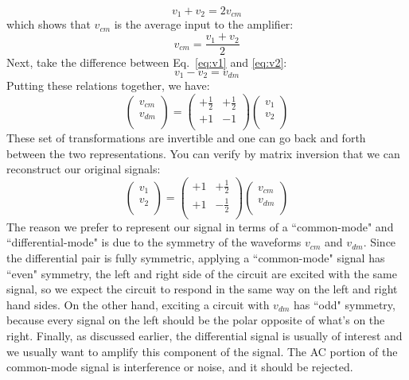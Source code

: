     \begin{equation}
        v_1 + v_2 = 2 v_{cm}
    \end{equation}
which shows that $v_{cm}$ is the average input to the amplifier:
    \begin{equation}
        v_{cm} = \frac{v_1 + v_2}{2}
    \end{equation}
Next, take the difference between Eq.~\ref{eq:v1} and \ref{eq:v2}:
    \begin{equation}
        v_1 - v_2 = v_{dm} 
    \end{equation}
Putting these relations together, we have:
    \begin{equation}
    	\begin{pmatrix}
    		v_{cm}\\
    		v_{dm}\\
    	\end{pmatrix} =
    	\begin{pmatrix}
    		+\frac{1}{2} & +\frac{1}{2}\\
    		+1 & -1\\
    	\end{pmatrix} 
    	\begin{pmatrix}
    		v_{1}\\
    		v_{2}\\
    	\end{pmatrix} 
    \end{equation}  
These set of transformations are invertible and one can go back and forth between the two representations.  You can verify by matrix inversion that we can reconstruct our original signals:
    \begin{equation}
    	\begin{pmatrix}
    		v_{1}\\
    		v_{2}\\
    	\end{pmatrix} =
    	\begin{pmatrix}
    		+1 & +\frac{1}{2}\\
    		+1 & -\frac{1}{2}\\
    	\end{pmatrix} 
    	\begin{pmatrix}
    		v_{cm}\\
    		v_{dm}\\
    	\end{pmatrix} 
    \end{equation}  
The reason we prefer to represent our signal in terms of a ``common-mode" and ``differential-mode" is due to the symmetry of the waveforms $v_{cm}$ and $v_{dm}$.  Since the differential pair is fully symmetric, applying a ``common-mode" signal has ``even" symmetry, the left and right side of the circuit are excited with the same signal, so we expect the circuit to respond in the same way on the left and right hand sides.  On the other hand, exciting a circuit with $v_{dm}$ has ``odd" symmetry, because every signal on the left should be the polar opposite of what's on the right.	Finally, as discussed earlier, the differential signal is usually of interest and we usually want to amplify this component of the signal. The AC portion of the common-mode signal is interference or noise, and it should be rejected.  
